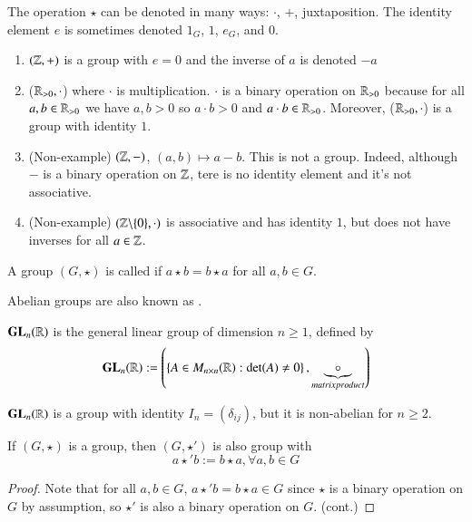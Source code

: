 \documentclass[12pt, a4paper, oneside, openright, titlepage]{book}
\begin{document}
\begin{rmk}
    The operation $\star$ can be denoted in many ways: $\cdot$, $+$, juxtaposition. The identity element $e$ is sometimes denoted $1_G$, $1$, $e_G$, and $0$.
\end{rmk}

\begin{eg}
    \leavevmode
    \begin{enumerate}
        \item $(\mathbb Z,+)$ is a group with $e = 0$ and the inverse of $a$ is denoted $-a$
        \item ($\mathbb R_{>0},\cdot$) where $\cdot$ is multiplication. $\cdot$ is a binary operation on $\mathbb R_{>0}$ because for all $a,b \in \mathbb R_{>0}$ we have $a,b >0$ so $a\cdot b > 0$ and $a \cdot b \in \mathbb R_{>0}$. Moreover, ($\mathbb R_{>0},\cdot$) is a group with identity $1$.
        \item (Non-example) $(\mathbb Z,-)$, $(a,b)\mapsto a-b$. This is not a group. Indeed, although $-$ is a binary operation on $\mathbb Z$, tere is no identity element and it's not associative.
        \item (Non-example) $(\mathbb Z\backslash \{0\},\cdot)$ is associative and has identity $1$, but does not have inverses for all $a \in \mathbb Z$.
    \end{enumerate}
\end{eg}

\begin{defn}
    A group $(G,\star)$ is called  if $a \star b = b \star a$ for all $a, b \in G$.
    \begin{rmk}
        Abelian groups are also known as .
    \end{rmk}
\end{defn}


\begin{eg}
    $\mathbf{GL}_n(\mathbb R)$ is the general linear group of dimension $n \geq 1$, defined by \begin{equation}
        \mathbf{GL}_n(\mathbb R) := \left(\left\{ A \in M_{n\times n}(\mathbb R): \det(A) \neq 0\right\},\underbrace{\circ}_{matrix product}\right)
    \end{equation}
    \begin{xca}
        $\mathbf{GL}_n(\mathbb R)$ is a group with identity $I_n = (\delta_{ij})$, but it is non-abelian for $n \geq 2$.
    \end{xca}
\end{eg}

\begin{xca}
    If $(G,\star)$ is a group, then $(G,\star')$ is also group with $$a \star' b := b\star a, \forall a,b \in G$$
    \begin{proof}
        Note that for all $a,b \in G$, $a \star' b = b \star a \in G$ since $\star$ is a binary operation on $G$ by assumption, so $\star'$ is also a binary operation on $G$. (cont.)
    \end{proof}
\end{xca}
\end{document}
